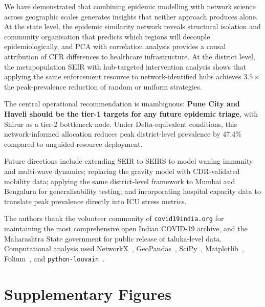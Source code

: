 \documentclass[sigconf,authordraft]{acmart}
\begin{document}
We have demonstrated that combining epidemic modelling with network science
across geographic scales generates insights that neither approach produces
alone. At the state level, the epidemic similarity network reveals
structural isolation and community organisation that predicts which
regions will decouple epidemiologically, and PCA with correlation analysis
provides a causal attribution of CFR differences to healthcare
infrastructure. At the district level, the metapopulation SEIR with
hub-targeted intervention analysis shows that applying the same enforcement
resource to network-identified hubs achieves $3.5\times$ the peak-prevalence
reduction of random or uniform strategies.

The central operational recommendation is unambiguous: \textbf{Pune City
and Haveli should be the tier-1 targets for any future epidemic
triage}, with Shirur as a tier-2 bottleneck node. Under Delta-equivalent
conditions, this network-informed allocation reduces peak
district-level prevalence by 47.4\% compared to unguided resource
deployment.

Future directions include extending SEIR to SEIRS to model waning
immunity and multi-wave dynamics; replacing the gravity model with
CDR-validated mobility data; applying the same district-level framework
to Mumbai and Bengaluru for generalisability testing; and incorporating
hospital capacity data to translate peak prevalence directly into ICU
stress metrics.

\begin{acks}
The authors thank the volunteer community of \texttt{covid19india.org}
for maintaining the most comprehensive open Indian COVID-19 archive,
and the Maharashtra State government for public release of taluka-level
data. Computational analysis used NetworkX~\cite{Hagberg2008},
GeoPandas~\cite{Jordahl2020}, SciPy~\cite{Virtanen2020},
Matplotlib~\cite{Hunter2007}, Folium~\cite{folium}, and
\texttt{python-louvain}~\cite{Blondel2008}.
\end{acks}




\appendix

\section{Supplementary Figures}
\label{app:supp}
\end{document}
